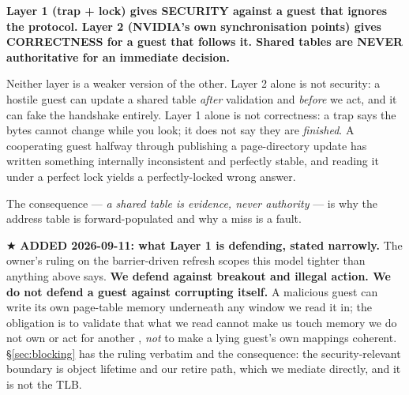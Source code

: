\documentclass[10.5pt]{article}
\begin{document}
\begin{claimbox}\small
\textbf{Layer 1 (trap + lock) gives SECURITY against a guest that ignores the protocol.
Layer 2 (NVIDIA's own synchronisation points) gives CORRECTNESS for a guest that follows it.
Shared tables are NEVER authoritative for an immediate decision.}
\hfill {}
\end{claimbox}

Neither layer is a weaker version of the other. Layer 2 alone is not security: a hostile guest
can update a shared table \emph{after} validation and \emph{before} we act, and it can fake the
handshake entirely. Layer 1 alone is not correctness: a trap says the bytes cannot change while
you look; it does not say they are \emph{finished}. A cooperating guest halfway through
publishing a page-directory update has written something internally inconsistent and perfectly
stable, and reading it under a perfect lock yields a perfectly-locked wrong answer.

The consequence — \emph{a shared table is evidence, never authority} — is why the address table
is forward-populated and why a miss is a fault.

★ \textbf{ADDED 2026-09-11: what Layer 1 is defending, stated narrowly.} The owner's ruling on
the barrier-driven refresh scopes this model tighter than anything above says. \textbf{We defend
against breakout and illegal action. We do not defend a guest against corrupting itself.} A
malicious guest can write its own page-table memory underneath any window we read it in; the
obligation is to validate that what we read cannot make us touch memory we do not own or act for
another , \emph{not} to make a lying guest's own mappings coherent. \S\ref{sec:blocking}
has the ruling verbatim and the consequence: the security-relevant boundary is object lifetime and
our retire path, which we mediate directly, and it is not the TLB.
\end{document}
